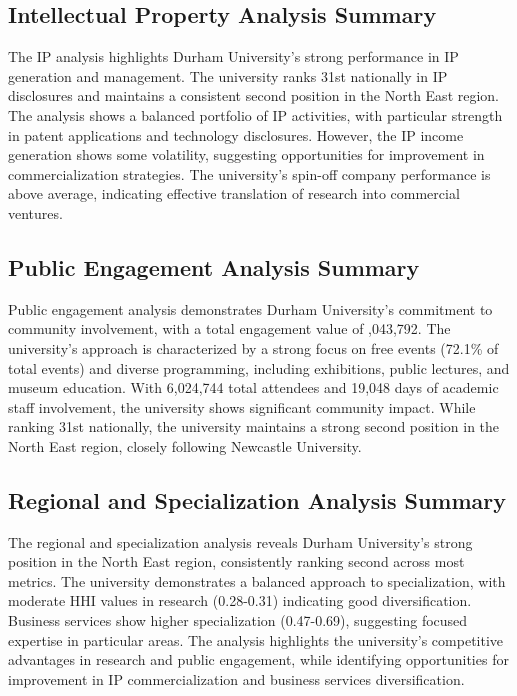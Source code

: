 \documentclass[journal,onecolumn, 10pt,draftclsnofoot]{IEEEtran}
\begin{document}
\subsection{Intellectual Property Analysis Summary}

The IP analysis highlights Durham University's strong performance in IP generation and management. The university ranks 31st nationally in IP disclosures and maintains a consistent second position in the North East region. The analysis shows a balanced portfolio of IP activities, with particular strength in patent applications and technology disclosures. However, the IP income generation shows some volatility, suggesting opportunities for improvement in commercialization strategies. The university's spin-off company performance is above average, indicating effective translation of research into commercial ventures.

\subsection{Public Engagement Analysis Summary}

Public engagement analysis demonstrates Durham University's commitment to community involvement, with a total engagement value of ,043,792. The university's approach is characterized by a strong focus on free events (72.1\% of total events) and diverse programming, including exhibitions, public lectures, and museum education. With 6,024,744 total attendees and 19,048 days of academic staff involvement, the university shows significant community impact. While ranking 31st nationally, the university maintains a strong second position in the North East region, closely following Newcastle University.

\subsection{Regional and Specialization Analysis Summary}

The regional and specialization analysis reveals Durham University's strong position in the North East region, consistently ranking second across most metrics. The university demonstrates a balanced approach to specialization, with moderate HHI values in research (0.28-0.31) indicating good diversification. Business services show higher specialization (0.47-0.69), suggesting focused expertise in particular areas. The analysis highlights the university's competitive advantages in research and public engagement, while identifying opportunities for improvement in IP commercialization and business services diversification.
\end{document}
